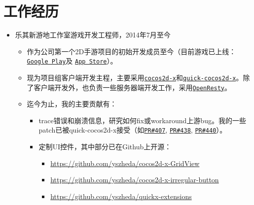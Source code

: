 \documentclass[letterpaper]{article}
\begin{document}

\section*{工作经历}
\begin{itemize}
    \item 乐其新游地工作室游戏开发工程师，2014年7月至今
        \begin{itemize}
            \item 作为公司第一个2D手游项目的初始开发成员至今（目前游戏已上线：
                \href{https://play.google.com/store/apps/details?id=com.game168.yysg}{\tt Google Play}及
                \href{https://itunes.apple.com/us/app/ye-ye-san-guo/id976517523?mt=8}{\tt App Store}）。
            \item 现为项目组客户端开发主程，主要采用\href{http://cocos2d-x.org/}{\tt cocos2d-x}和\href{https://github.com/dualface/v3quick}{\tt quick-cocos2d-x}。除了客户端开发外，也负责一些服务器端开发工作，采用\href{https://github.com/openresty/openresty}{\tt OpenResty}。
            \item 迄今为止，我的主要贡献有：
                \begin{itemize}
                    \item trace错误和崩溃信息，研究如何fix或workaround上游bug。我的一些patch已被quick-cocos2d-x接受（如\href{https://github.com/dualface/v3quick/pull/407}{\tt PR\#407}, \href{https://github.com/dualface/v3quick/pull/438}{\tt PR\#438}, \href{https://github.com/dualface/v3quick/pull/440}{\tt PR\#440}）。
                    \item 定制UI控件，其中部分已在Github上开源：
                        \begin{itemize}
                            \item \url{https://github.com/yszheda/cocos2d-x-GridView}
                            \item \url{https://github.com/yszheda/cocos2d-x-irregular-button}
                            \item \url{https://github.com/yszheda/quickx-extensions}

\end{itemize}
\end{itemize}
\end{itemize}
\end{itemize}
\end{document}
